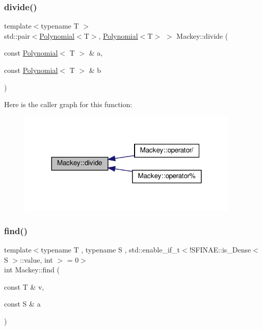 \subsubsection{\texorpdfstring{divide()}{divide()}}
{\footnotesize\ttfamily template$<$typename T $>$ \\
std\+::pair$<$\hyperlink{classMackey_1_1Polynomial}{Polynomial}$<$T$>$, \hyperlink{classMackey_1_1Polynomial}{Polynomial}$<$T$>$ $>$ Mackey\+::divide (\begin{DoxyParamCaption}\item[{const \hyperlink{classMackey_1_1Polynomial}{Polynomial}$<$ T $>$ \&}]{a,  }\item[{const \hyperlink{classMackey_1_1Polynomial}{Polynomial}$<$ T $>$ \&}]{b }\end{DoxyParamCaption})}

Here is the caller graph for this function\+:\nopagebreak
\begin{figure}[H]
\begin{center}
\leavevmode
\includegraphics[width=300pt]{namespaceMackey_a04fadcf186ab504cafeb259178ee4827_icgraph}
\end{center}
\end{figure}
\mbox{\label{namespaceMackey_a91104eaef1ab349e68f0623cfaaf45c0}} 
\subsubsection{\texorpdfstring{find()}{find()}}
{\footnotesize\ttfamily template$<$typename T , typename S , std\+::enable\+\_\+if\+\_\+t$<$!\+S\+F\+I\+N\+A\+E\+::is\+\_\+\+Dense$<$ S $>$\+::value, int $>$  = 0$>$ \\
int Mackey\+::find (\begin{DoxyParamCaption}\item[{const T \&}]{v,  }\item[{const S \&}]{a }\end{DoxyParamCaption})}



